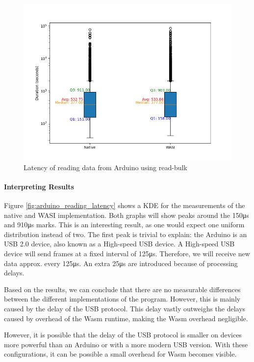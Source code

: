 \begin{figure}[H]
  \centering
  \includegraphics[width=1\textwidth]{images/arduino_latency_boxplot.png}
  \caption{Latency of reading data from Arduino using read-bulk}
  \label{fig:arduino_reading_latency_boxplot}
\end{figure}


\paragraph{Interpreting Results}
Figure \ref{fig:arduino_reading_latency} shows a \acrfull{KDE} for the measurements of the native and \acrshort{WASI} implementation.
Both graphs will show peaks around the 150μs and 910μs marks. This is an interesting result, as one would expect one uniform distribution instead of two. The first peak is trivial to explain: the Arduino is an USB 2.0 device, also known as a High-speed USB device. A High-speed USB device will send frames at a fixed interval of 125μs. Therefore, we will receive new data approx. every 125μs. An extra 25μs are introduced because of processing delays.

Based on the results, we can conclude that there are no measurable differences between the different implementations of the program. However, this is mainly caused by the delay of the USB protocol. This delay vastly outweighs the delays caused by overhead of the Wasm runtime, making the Wasm overhead negligible.

However, it is possible that the delay of the USB protocol is smaller on devices more powerful than an Arduino or with a more modern USB version. With these configurations, it can be possible a small overhead for Wasm becomes visible.

